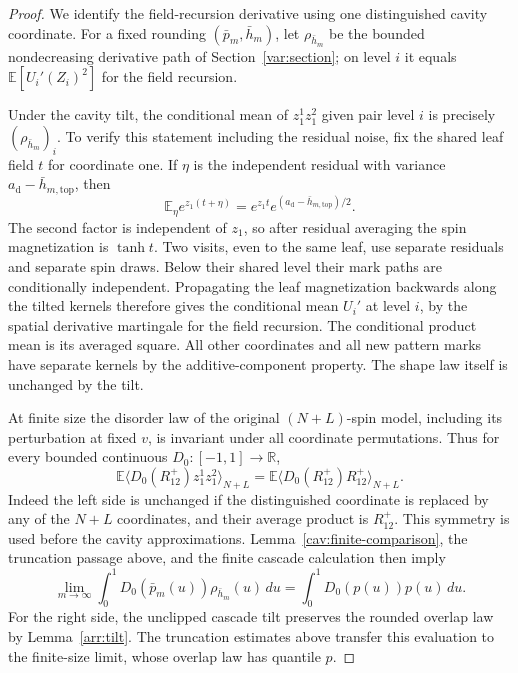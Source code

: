 \begin{proof}
We identify the field-recursion derivative using one distinguished
cavity coordinate.  For a fixed rounding $(\bar p_m,\bar h_m)$, let
$\rho_{\bar h_m}$ be the bounded nondecreasing derivative path of
Section~\ref{var:section}; on level $i$ it equals
$\mathbb E[U_i'(Z_i)^2]$ for the field recursion.

Under the cavity tilt, the conditional mean of $z_1^1z_1^2$ given
pair level $i$ is precisely $(\rho_{\bar h_m})_i$.  To verify this
statement including the residual noise, fix the shared leaf field
$t$ for coordinate one.  If $\eta$ is the independent residual with
variance $a_{\mathrm d}-\bar h_{m,\mathrm{top}}$, then
\[
 \mathbb E_\eta e^{z_1(t+\eta)}
   =e^{z_1t}e^{(a_{\mathrm d}-\bar h_{m,\mathrm{top}})/2}.
\]
The second factor is independent of $z_1$, so after residual averaging
the spin magnetization is $\tanh t$.  Two visits, even to the same
leaf, use separate residuals and separate spin draws.  Below their
shared level their mark paths are conditionally independent.
Propagating the leaf magnetization backwards along the tilted kernels
therefore gives the conditional mean $U_i'$ at level $i$, by the
spatial derivative martingale for the field recursion.  The conditional
product mean is its averaged square.  All other coordinates and all
new pattern marks have separate kernels by the additive-component
property.  The shape law itself is unchanged by the tilt.

At finite size the disorder law of the original $(N+L)$-spin model,
including its perturbation at fixed $v$, is invariant under all
coordinate permutations.  Thus for every bounded continuous
$D_0:[-1,1]\to\mathbb R$,
\begin{equation}\label{cav:coordinate-identity}
 \mathbb E\langle D_0(R^+_{12})z_1^1z_1^2\rangle_{N+L}
 =\mathbb E\langle D_0(R^+_{12})R^+_{12}\rangle_{N+L}.
\end{equation}
Indeed the left side is unchanged if the distinguished coordinate is
replaced by any of the $N+L$ coordinates, and their average product is
$R^+_{12}$.  This symmetry is used before the cavity approximations.
Lemma~\ref{cav:finite-comparison}, the truncation passage above, and the
finite cascade calculation then imply
\begin{equation}\label{cav:rho-test}
 \lim_{m\to\infty}\int_0^1
    D_0(\bar p_m(u))\rho_{\bar h_m}(u)\,du
 =\int_0^1 D_0(p(u))p(u)\,du.
\end{equation}
For the right side, the unclipped cascade tilt preserves the rounded
overlap law by Lemma~\ref{arr:tilt}.  The truncation estimates above
transfer this evaluation to the finite-size limit, whose overlap law
has quantile $p$.


\end{proof}
